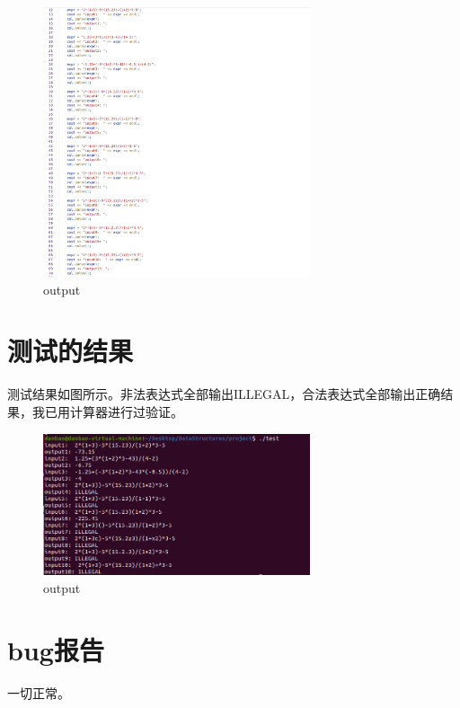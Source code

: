 \documentclass[UTF8]{ctexart}
\begin{document}
    	\begin{figure}[H] %
			\centering %
			\includegraphics[width=0.7\textwidth]{fig1} %
			\caption{output} %
			\label{Fig.test} %
		\end{figure}

	\section{测试的结果}
	
	测试结果如图所示。非法表达式全部输出ILLEGAL，合法表达式全部输出正确结果，我已用计算器进行过验证。
	 
		
		\begin{figure}[H] %
			\centering %
			\includegraphics[width=0.7\textwidth]{fig2} %
			\caption{output} %
			\label{Fig.output} %
		\end{figure}
		
	
	\section{bug报告}
	
	一切正常。
	
\end{document}
